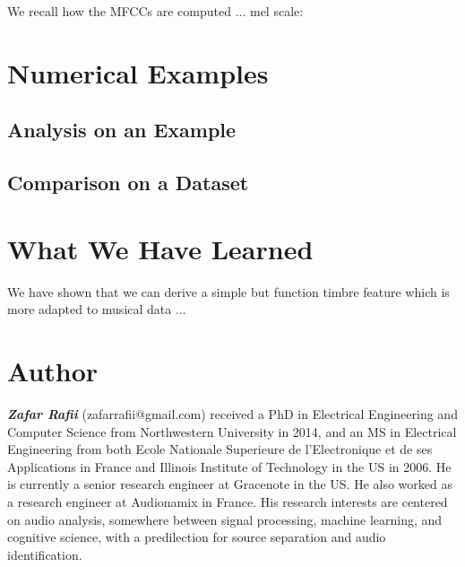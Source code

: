 \documentclass[journal]{IEEEtran}
\begin{document}
We recall how the MFCCs are computed ...\cite{mermelstein1976}
mel scale: \cite{stevens1937}



\section{Numerical Examples} %

\subsection{Analysis on an Example}



\subsection{Comparison on a Dataset}





\section{What We Have Learned}

We have shown that we can derive a simple but function timbre feature which is more adapted to musical data ...




\section{Author}

\textit{\textbf{Zafar Rafii}} (zafarrafii@gmail.com) received a PhD in Electrical Engineering and Computer Science from Northwestern University in 2014, and an MS in Electrical Engineering from both Ecole Nationale Superieure de l’Electronique et de ses Applications in France and Illinois Institute of Technology in the US in 2006. He is currently a senior research engineer at Gracenote in the US. He also worked as a research engineer at Audionamix in France. His research interests are centered on audio analysis, somewhere between signal processing, machine learning, and cognitive science, with a predilection for source separation and audio identification.



\end{document}

